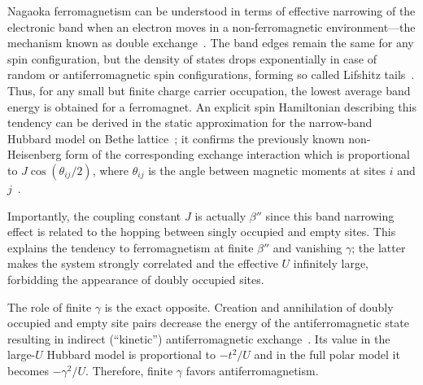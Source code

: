 Nagaoka ferromagnetism can be understood in terms of effective narrowing of the electronic band when an electron moves in a non-ferromagnetic environment---the mechanism known as double exchange~\cite{anderson1963theory}. The band edges remain the same for any spin configuration, but the density of states drops exponentially in case of random or antiferromagnetic spin configurations, forming so called Lifshitz tails~\cite{brinkman1970single,auslender2005electron,auslender2006electron}. Thus, for any small but finite charge carrier occupation, the lowest average band energy is obtained for a ferromagnet. An explicit spin Hamiltonian describing this tendency can be derived in the static approximation for the narrow-band Hubbard model on Bethe lattice~\cite{auslender1982effective}; it confirms the previously known non-Heisenberg form of the corresponding exchange interaction which is proportional to $J\cos(\theta_{ij}/2)$, where $\theta_{ij}$ is the angle between magnetic moments at sites $i$ and $j$~\cite{anderson1963theory}.

Importantly, the coupling constant $J$ is actually $\beta''$ since this band narrowing effect is related to the hopping between singly occupied and empty sites. This explains the tendency to ferromagnetism at finite $\beta''$ and vanishing $\gamma$; the latter makes the system strongly correlated and the effective $U$ infinitely large, forbidding the appearance of doubly occupied sites. 

The role of finite $\gamma$ is the exact opposite. Creation and annihilation of doubly occupied and empty site pairs decrease the energy of the antiferromagnetic state resulting in indirect (``kinetic'') antiferromagnetic exchange~\cite{anderson1963theory}. Its value in the large-$U$ Hubbard model is proportional to $-t^2/U$ and in the full polar model it becomes $-\gamma^2/U$. Therefore, finite $\gamma$ favors antiferromagnetism. 

